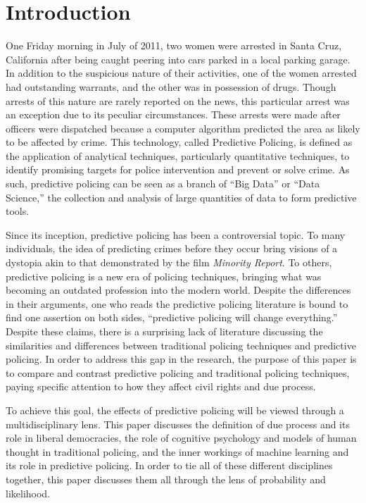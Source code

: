 \documentclass[12pt]{article} %
\begin{document}
\section{Introduction}\label{sec:introduction} %

One Friday morning in July of 2011, two women were arrested in Santa Cruz, California after being caught peering into cars parked in a local parking garage. In addition to the suspicious nature of their activities, one of the women arrested had outstanding warrants, and the other was in possession of drugs. Though arrests of this nature are rarely reported on the news, this particular arrest was an exception due to its peculiar circumstances. These arrests were made after officers were dispatched because a computer algorithm predicted the area as likely to be affected by crime. \cite{nyt} 
This technology, called Predictive Policing, is defined as the application of analytical techniques, particularly quantitative techniques, to identify promising targets for police intervention and prevent or solve crime. \cite{perryetal} As such, predictive policing can be seen as a branch of ``Big Data'' or ``Data Science,'' the collection and analysis of large quantities of data to form predictive tools.

Since its inception, predictive policing has been a controversial topic. To many individuals, the idea of predicting crimes before they occur bring visions of a dystopia akin to that demonstrated by the film \textit{Minority Report}. To others, predictive policing is a new era of policing techniques, bringing what was becoming an outdated profession into the modern world. Despite the differences in their arguments, one who reads the predictive policing literature is bound to find one assertion on both sides, ``predictive policing will change everything.'' Despite these claims, there is a surprising lack of literature discussing the similarities and differences between traditional policing techniques and predictive policing. In order to address this gap in the research, the purpose of this paper is to compare and contrast predictive policing and traditional policing techniques, paying specific attention to how they affect civil rights and due process. 

To achieve this goal, the effects of predictive policing will be viewed through a multidisciplinary lens. This paper discusses the definition of due process and its role in liberal democracies, the role of cognitive psychology and models of human thought in traditional policing, and the inner workings of machine learning and its role in predictive policing. In order to tie all of these different disciplines together, this paper discusses them all through the lens of probability and likelihood.
\end{document}
